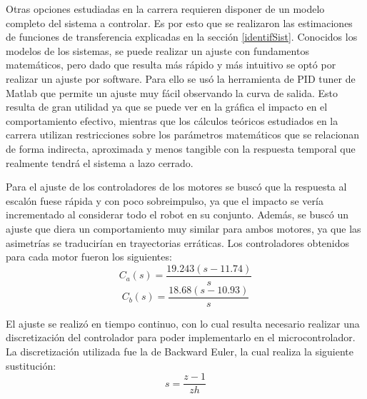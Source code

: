 \documentclass[10pt,conference,a4paper,onecolumn]{article}%
\begin{document}
Otras opciones estudiadas en la carrera requieren disponer de un modelo completo del sistema a controlar. Es por esto que se realizaron las estimaciones de funciones de transferencia explicadas en la sección \ref{identifSist}. Conocidos los modelos de los sistemas, se puede realizar un ajuste con fundamentos matemáticos, pero dado que resulta más rápido y más intuitivo se optó por realizar un ajuste por software. Para ello se usó la herramienta de PID tuner de Matlab \cite{PID_tuner} que permite un ajuste muy fácil observando la curva de salida. Esto resulta de gran utilidad ya que se puede ver en la gráfica el impacto en el comportamiento efectivo, mientras que los cálculos teóricos estudiados en la carrera utilizan restricciones sobre los parámetros matemáticos que se relacionan de forma indirecta, aproximada y menos tangible con la respuesta temporal que realmente tendrá el sistema a lazo cerrado.

Para el ajuste de los controladores de los motores se buscó que la respuesta al escalón fuese rápida y con poco sobreimpulso, ya que el impacto se vería incrementado al considerar todo el robot en su conjunto. Además, se buscó un ajuste que diera un comportamiento muy similar para ambos motores, ya que las asimetrías se traducirían en trayectorias erráticas. Los controladores obtenidos para cada motor fueron los siguientes:
\begin{equation*}
C_a(s)= \frac{  19.243 (s-11.74)}{s}
\end{equation*}
\begin{equation*}
C_b(s)= \frac{ 18.68 (s-10.93)}{s}
\end{equation*}

El ajuste se realizó en tiempo continuo, con lo cual resulta necesario realizar una discretización del controlador para poder implementarlo en el microcontrolador. La discretización utilizada fue la de Backward Euler, la cual realiza la siguiente sustitución:
\begin{equation*}
s=\frac{z-1}{zh}
\end{equation*}%
\end{document}
